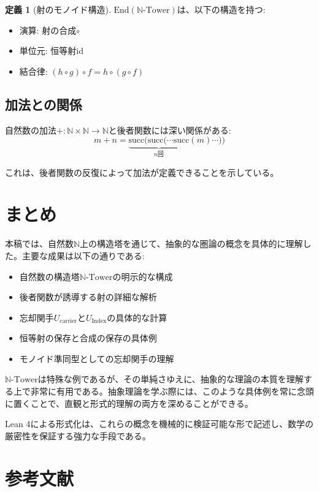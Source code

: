 \documentclass[a4paper,12pt]{article}
\theoremstyle{definition}
\newtheorem{definition}{定義}[section]
\begin{document}
\begin{definition}[射のモノイド構造]
$\text{End}(\mathbb{N}\text{-Tower})$は、以下の構造を持つ:
\begin{itemize}
\item 演算: 射の合成$\circ$
\item 単位元: 恒等射$\text{id}$
\item 結合律: $(h \circ g) \circ f = h \circ (g \circ f)$
\end{itemize}
\end{definition}

\subsection{加法との関係}

自然数の加法$+ : \mathbb{N} \times \mathbb{N} \to \mathbb{N}$と後者関数には深い関係がある:
\[
m + n = \underbrace{\text{succ}(\text{succ}(\cdots \text{succ}}_{\text{$n$回}}(m) \cdots ))
\]

これは、後者関数の反復によって加法が定義できることを示している。

\section{まとめ}

本稿では、自然数$\mathbb{N}$上の構造塔を通じて、抽象的な圏論の概念を具体的に理解した。主要な成果は以下の通りである:

\begin{itemize}
\item 自然数の構造塔$\mathbb{N}\text{-Tower}$の明示的な構成
\item 後者関数が誘導する射の詳細な解析
\item 忘却関手$U_{\text{carrier}}$と$U_{\text{Index}}$の具体的な計算
\item 恒等射の保存と合成の保存の具体例
\item モノイド準同型としての忘却関手の理解
\end{itemize}

$\mathbb{N}\text{-Tower}$は特殊な例であるが、その単純さゆえに、抽象的な理論の本質を理解する上で非常に有用である。抽象理論を学ぶ際には、このような具体例を常に念頭に置くことで、直観と形式的理解の両方を深めることができる。

Lean 4による形式化は、これらの概念を機械的に検証可能な形で記述し、数学の厳密性を保証する強力な手段である。

\section*{参考文献}
\end{document}
